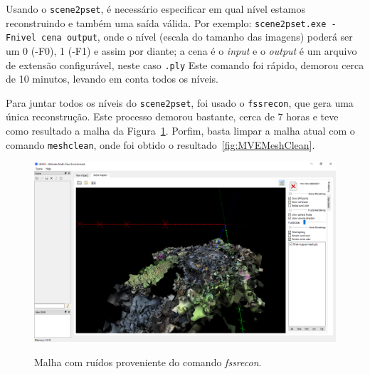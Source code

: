 Usando o \texttt{scene2pset}, é necessário especificar em qual nível estamos
reconstruindo e também uma saída válida. Por exemplo: \texttt{scene2pset.exe -Fnivel
cena output}, onde o nível (escala do tamanho das imagens) poderá ser um 0 (-F0), 1 (-F1) e assim por diante; a
cena é o \emph{input} e o \emph{output} é um arquivo de extensão configurável,
neste caso \texttt{.ply} %
Este comando foi rápido, demorou
cerca de 10 minutos, levando em conta todos os níveis.


Para juntar todos os níveis do \texttt{scene2pset}, foi usado o \texttt{fssrecon},
que gera uma única reconstrução. Este processo demorou bastante, cerca de 7
horas e teve como resultado a malha da Figura~\ref{fig:MVEFSSRMesh}.
Porfim, basta limpar a malha atual com o comando \texttt{meshclean}, onde foi
obtido o resultado~\ref{fig:MVEMeshClean}.


\begin{figure}[!h]
	\centering
	\caption{%
	Malha com ruídos proveniente do comando \emph{fssrecon}.
	}
	\includegraphics[width=0.95\linewidth]{figs/mvemeshout.png}
		\label{fig:MVEFSSRMesh}
\end{figure} 

